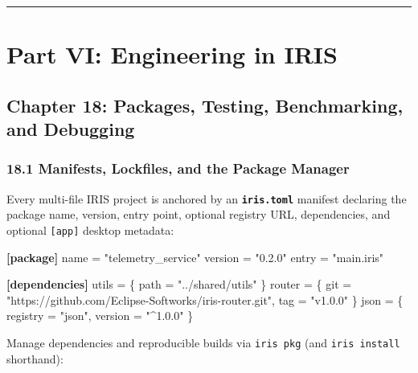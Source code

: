 \documentclass[
  english,
  oneside]{book}
\newenvironment{Shaded}{\begin{snugshade}}{\end{snugshade}}
\newcommand{\DataTypeTok}[1]{\textcolor[rgb]{0.31,0.79,0.69}{#1}}
\newcommand{\KeywordTok}[1]{\textcolor[rgb]{0.34,0.61,0.84}{\textbf{#1}}}
\newcommand{\OperatorTok}[1]{\textcolor[rgb]{0.83,0.83,0.83}{#1}}
\newcommand{\StringTok}[1]{\textcolor[rgb]{0.81,0.57,0.47}{#1}}
\begin{document}
\begin{center}\rule{0.5\linewidth}{0.5pt}\end{center}

\part{Part VI: Engineering in IRIS}\label{part-vi-engineering-in-iris}

\chapter{Chapter 18: Packages, Testing, Benchmarking, and
Debugging}\label{chapter-18-packages-testing-benchmarking-and-debugging}

\section{18.1 Manifests, Lockfiles, and the Package
Manager}\label{manifests-lockfiles-and-the-package-manager}

Every multi-file IRIS project is anchored by an
\textbf{\texttt{iris.toml}} manifest declaring the package name,
version, entry point, optional registry URL, dependencies, and optional
\texttt{{[}app{]}} desktop metadata:

\begin{Shaded}
\begin{Highlighting}[]
\KeywordTok{[package]}
\DataTypeTok{name}    \OperatorTok{=} \StringTok{"telemetry\_service"}
\DataTypeTok{version} \OperatorTok{=} \StringTok{"0.2.0"}
\DataTypeTok{entry}   \OperatorTok{=} \StringTok{"main.iris"}

\KeywordTok{[dependencies]}
\DataTypeTok{utils}  \OperatorTok{=} \OperatorTok{\{ }\DataTypeTok{path}\OperatorTok{ =} \StringTok{"../shared/utils"}\OperatorTok{ \}}
\DataTypeTok{router} \OperatorTok{=} \OperatorTok{\{ }\DataTypeTok{git}\OperatorTok{ =} \StringTok{"https://github.com/Eclipse{-}Softworks/iris{-}router.git"}\OperatorTok{, }\DataTypeTok{tag}\OperatorTok{ =} \StringTok{"v1.0.0"}\OperatorTok{ \}}
\DataTypeTok{json}   \OperatorTok{=} \OperatorTok{\{ }\DataTypeTok{registry}\OperatorTok{ =} \StringTok{"json"}\OperatorTok{, }\DataTypeTok{version}\OperatorTok{ =} \StringTok{"\^{}1.0.0"}\OperatorTok{ \}}
\end{Highlighting}
\end{Shaded}

Manage dependencies and reproducible builds via \texttt{iris\ pkg} (and
\texttt{iris\ install} shorthand):
\end{document}
